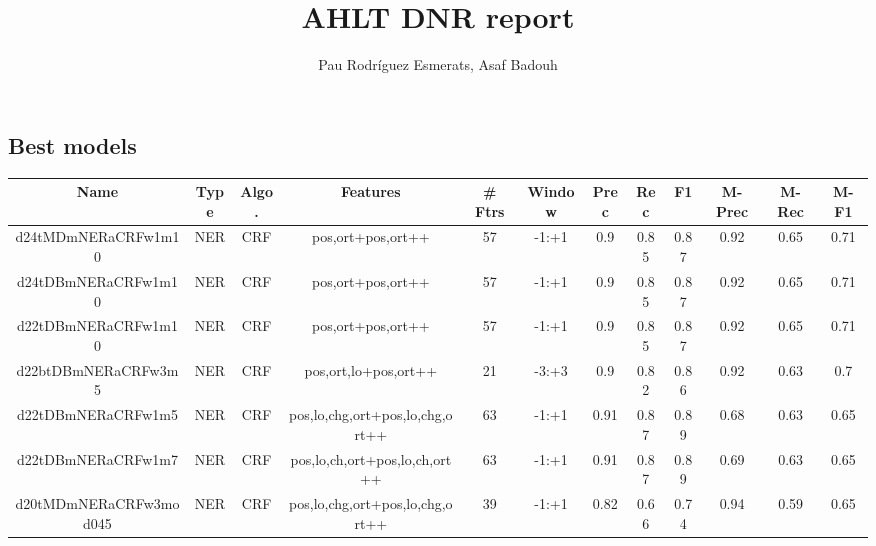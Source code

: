 \documentclass[a4paper]{article}
\title{AHLT DNR report}
\author{Pau Rodríguez Esmerats, Asaf Badouh }
\begin{document}
\begin{landscape}

\section{ Best models}
\begin{center}
\begin{tabular}{ |c|c|c|c|c|c|c|c|c|c|c|c|} 
 \hline
 	Name & Type & Algo. & Features & \# Ftrs & Window & Prec & Rec & F1 & M-Prec & M-Rec & M-F1\\
 \hline
 
 	
 		
 		\small{ d24tMDmNERaCRFw1m10 } & NER & CRF & pos,ort+pos,ort++  &  57 &  -1:+1  &  0.9 & 0.85 & 0.87  &  0.92 & 0.65 & 0.71 \\
 		

 	
 
 	
 		
 		\small{ d24tDBmNERaCRFw1m10 } & NER & CRF & pos,ort+pos,ort++  &  57 &  -1:+1  &  0.9 & 0.85 & 0.87  &  0.92 & 0.65 & 0.71 \\
 		

 	
 
 	
 		
 		\small{ d22tDBmNERaCRFw1m10 } & NER & CRF & pos,ort+pos,ort++  &  57 &  -1:+1  &  0.9 & 0.85 & 0.87  &  0.92 & 0.65 & 0.71 \\
 		

 	
 
 	
 		
 		\small{ d22btDBmNERaCRFw3m5 } & NER & CRF & pos,ort,lo+pos,ort++  &  21 &  -3:+3  &  0.9 & 0.82 & 0.86  &  0.92 & 0.63 & 0.7 \\
 		

 	
 
 	
 		
 		\small{ d22tDBmNERaCRFw1m5 } & NER & CRF & pos,lo,chg,ort+pos,lo,chg,ort++  &  63 &  -1:+1  &  0.91 & 0.87 & 0.89  &  0.68 & 0.63 & 0.65 \\
 		

 	
 
 	
 		
 		\small{ d22tDBmNERaCRFw1m7 } & NER & CRF & pos,lo,ch,ort+pos,lo,ch,ort++  &  63 &  -1:+1  &  0.91 & 0.87 & 0.89  &  0.69 & 0.63 & 0.65 \\
 		

 	
 
 	
 		
 		\small{ d20tMDmNERaCRFw3mod045 } & NER & CRF & pos,lo,chg,ort+pos,lo,chg,ort++  &  39 &  -1:+1  &  0.82 & 0.66 & 0.74  &  0.94 & 0.59 & 0.65 \\
 		


\end{tabular}
\end{center}
\end{landscape}
\end{document}
